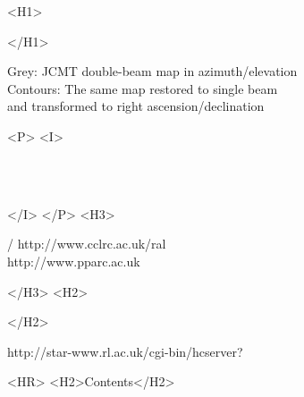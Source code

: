 \begin{htmlonly}
   \xlabel{}
   \begin{rawhtml} <H1> \end{rawhtml}
      \stardoctitle
   \begin{rawhtml} </H1> \end{rawhtml}

   \begin{figure}[h]
   \epsfysize=130mm
   \end{figure}

   Grey: JCMT double-beam map in azimuth/elevation\\
   Contours: The same map restored to single beam\\
   and transformed to right ascension/declination

   \begin{rawhtml} <P> <I> \end{rawhtml}
   \stardoccategory \stardocnumber \\
   \stardocauthors \\
   \stardocdate
   \begin{rawhtml} </I> </P> <H3> \end{rawhtml}
       /
                        {http://www.cclrc.ac.uk/ral} \\
                        {http://www.pparc.ac.uk} \\
   \begin{rawhtml} </H3> <H2> \end{rawhtml}
   \begin{rawhtml} </H2> \end{rawhtml}
      {http://star-www.rl.ac.uk/cgi-bin/hcserver?\stardocsource}\\

  \label{stardoccontents}
  \begin{rawhtml} 
    <HR>
    <H2>Contents</H2>
  \end{rawhtml}
  \renewcommand{\latexonlytoc}[0]{}


\end{htmlonly}
